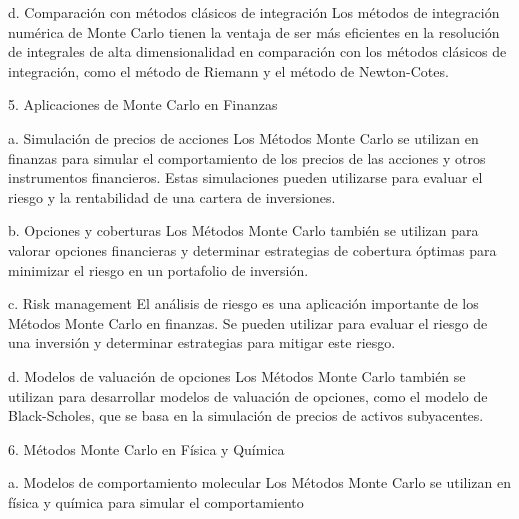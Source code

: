 d. Comparación con métodos clásicos de integración
Los métodos de integración numérica de Monte Carlo tienen la ventaja de ser más eficientes en la resolución de integrales de alta dimensionalidad en comparación con los métodos clásicos de integración, como el método de Riemann y el método de Newton-Cotes.

5. Aplicaciones de Monte Carlo en Finanzas

a. Simulación de precios de acciones
Los Métodos Monte Carlo se utilizan en finanzas para simular el comportamiento de los precios de las acciones y otros instrumentos financieros. Estas simulaciones pueden utilizarse para evaluar el riesgo y la rentabilidad de una cartera de inversiones.

b. Opciones y coberturas
Los Métodos Monte Carlo también se utilizan para valorar opciones financieras y determinar estrategias de cobertura óptimas para minimizar el riesgo en un portafolio de inversión.

c. Risk management
El análisis de riesgo es una aplicación importante de los Métodos Monte Carlo en finanzas. Se pueden utilizar para evaluar el riesgo de una inversión y determinar estrategias para mitigar este riesgo.

d. Modelos de valuación de opciones
Los Métodos Monte Carlo también se utilizan para desarrollar modelos de valuación de opciones, como el modelo de Black-Scholes, que se basa en la simulación de precios de activos subyacentes.

6. Métodos Monte Carlo en Física y Química

a. Modelos de comportamiento molecular
Los Métodos Monte Carlo se utilizan en física y química para simular el comportamiento
